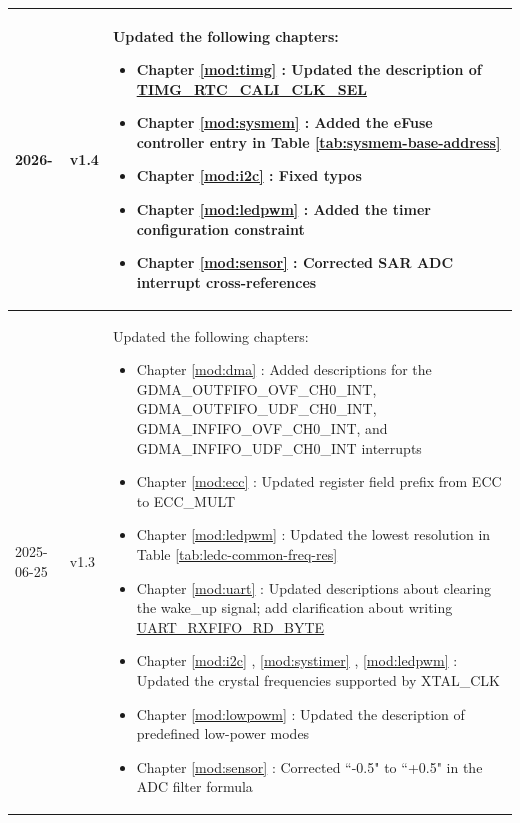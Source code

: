 \begin{longtable}[l]{ | m{2cm} | m{1.5cm} | m{12cm} | }
    2026- & v1.4 &
    Updated the following chapters:
    \begin{itemize}
        \item Chapter \ref{mod:timg} \textit{\nameref{mod:timg}}: Updated the description of \hyperref[fielddesc:TIMGRTCCALICLKSEL]{TIMG\_RTC\_CALI\_CLK\_SEL} %
        \item Chapter \ref{mod:sysmem} \textit{\nameref{mod:sysmem}}: Added the eFuse controller entry in Table \ref{tab:sysmem-base-address} %
        \item Chapter \ref{mod:i2c} \textit{\nameref{mod:i2c}}: Fixed typos %
        \item Chapter \ref{mod:ledpwm} \textit{\nameref{mod:ledpwm}}: Added the timer configuration constraint %
        \item Chapter \ref{mod:sensor} \textit{\nameref{mod:sensor}}: Corrected SAR ADC interrupt cross-references %
    \end{itemize}
    \\\hline
    2025-06-25 & v1.3 &
     Updated the following chapters:
     \begin{itemize}
         \item Chapter \ref{mod:dma} \textit{\nameref{mod:dma}}: Added descriptions for the  GDMA\_OUTFIFO\_OVF\_CH0\_INT, GDMA\_OUTFIFO\_UDF\_CH0\_INT, GDMA\_INFIFO\_OVF\_CH0\_INT, and GDMA\_INFIFO\_UDF\_CH0\_INT interrupts %
         \item Chapter \ref{mod:ecc} \nameref{mod:ecc}: Updated register field prefix from ECC to ECC\_MULT %
         \item Chapter \ref{mod:ledpwm} \textit{\nameref{mod:ledpwm}}: Updated the lowest resolution in Table \ref{tab:ledc-common-freq-res}  %
         \item Chapter \ref{mod:uart} \textit{\nameref{mod:uart}}: Updated descriptions about clearing the wake\_up signal; add clarification about writing \hyperref[fielddesc:UARTRXFIFORDBYTE]{UART\_RXFIFO\_RD\_BYTE} %
         \item Chapter \ref{mod:i2c} \textit{\nameref{mod:i2c}}, \ref{mod:systimer} \textit{\nameref{mod:systimer}}, \ref{mod:ledpwm} \textit{\nameref{mod:ledpwm}}: Updated the crystal frequencies supported by XTAL\_CLK %
         \item Chapter \ref{mod:lowpowm} \textit{\nameref{mod:lowpowm}}: Updated the description of predefined low-power modes %
         \item Chapter \ref{mod:sensor} \textit{\nameref{mod:sensor}}: Corrected ``-0.5" to ``+0.5" in the ADC filter formula %

\end{itemize}
\end{longtable}
